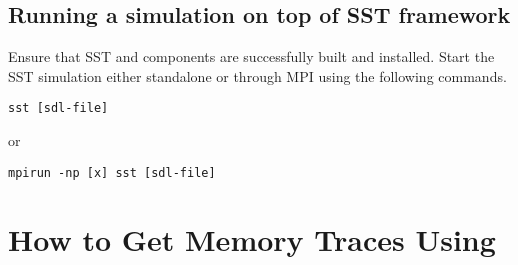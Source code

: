 \subsection{Running a \SIM simulation on top of SST framework}

Ensure that SST and \SIM components are successfully built and installed.  
Start the SST simulation either standalone or through MPI using the following commands.

\begin{Verbatim}
sst [sdl-file]
\end{Verbatim}
or
\begin{Verbatim}
mpirun -np [x] sst [sdl-file]
\end{Verbatim}


\ignore
	  {
	  \section{How to Get Memory Traces Using \SIM}

	  }









